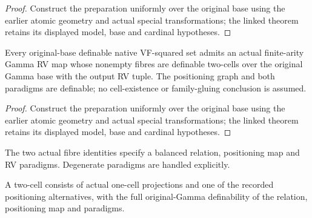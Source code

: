 \begin{proof}


\leanok

Construct the preparation uniformly over the original base using the earlier atomic geometry and actual special transformations; the linked theorem retains its displayed model, base and cardinal hypotheses.

\end{proof}

\begin{lemma}

\label{s4-8}


\leanok

Every original-base definable native VF-squared set admits an actual finite-arity Gamma RV map whose nonempty fibres are definable two-cells over the original Gamma base with the output RV tuple. The positioning graph and both paradigms are definable; no cell-existence or family-gluing conclusion is assumed.

\end{lemma}

\begin{proof}


\leanok

Construct the preparation uniformly over the original base using the earlier atomic geometry and actual special transformations; the linked theorem retains its displayed model, base and cardinal hypotheses.

\end{proof}

\begin{definition}

\label{s4-balanced}


\leanok

The two actual fibre identities specify a balanced relation, positioning map and RV paradigms. Degenerate paradigms are handled explicitly.

\end{definition}

\begin{definition}

\label{s4-cells}


\leanok

A two-cell consists of actual one-cell projections and one of the recorded positioning alternatives, with the full original-Gamma definability of the relation, positioning map and paradigms.

\end{definition}

